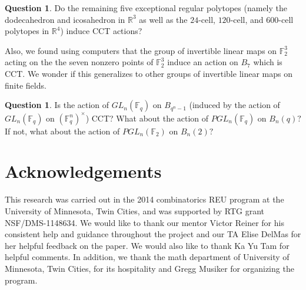 \documentclass[10 pt]{amsart}
\theoremstyle{plain}
\theoremstyle{definition}
\newtheorem{question}[thm]{Question}
\theoremstyle{remark}
\numberwithin{equation}{section}
\begin{document}
\begin{question}
\label{question:exceptional_polytopes_cct}
Do the remaining five exceptional regular polytopes (namely the dodecahedron and icosahedron in $\mathbb R^3$ as well as the $24$-cell, $120$-cell, and $600$-cell polytopes in $\mathbb R^4$) induce CCT actions?
\end{question}

Also, we found using computers that the group of invertible linear maps on $\mathbb F_2^3$ acting on the the seven nonzero points of $\mathbb F_2^3$ induce an action on $B_7$ which is CCT. We wonder if this generalizes to other groups of invertible linear maps on finite fields.

\begin{question}
Is the action of $GL_n(\mathbb F_q)$ on $B_{q^n-1}$ (induced by the action of $GL_n(\mathbb F_q)$ on $(\mathbb F_q^n)^\times$) CCT? What about the action of $PGL_n(\mathbb F_q)$ on $B_n(q)?$ If not, what about the action of $PGL_n(\mathbb F_2)$ on $B_n(2)?$ 
\end{question}

\section*{Acknowledgements}
This research was carried out in the 2014 combinatorics REU program at the University of Minnesota, Twin Cities, and was supported by RTG grant NSF/DMS-1148634.
We would like to thank our mentor Victor Reiner for his consistent help and guidance throughout the project and our TA Elise DelMas for her helpful feedback on the paper. We would also like to thank Ka Yu Tam for helpful comments.  In addition, we thank the math department of University of Minnesota, Twin Cities, for its hospitality and Gregg Musiker for organizing the program.



\end{document}
